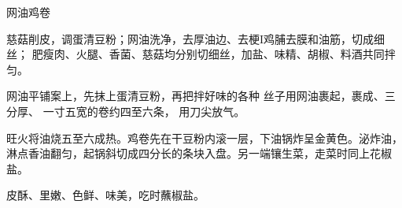 \begin{recipe}{网油鸡卷}

\ingredients



\cooking

\step 慈菇削皮，调蛋清豆粉；网油洗净，去厚油边、去梗I鸡脯去膜和油筋，切成细丝；
肥瘦肉、火腿、香菌、慈菇均分别切细丝，加盐、味精、胡椒、料酒共同拌匀。

网油平铺案上，先抹上蛋清豆粉，再把拌好味的各种 丝子用网油裹起，裹成、三分厚、
一寸五宽的卷约四至六条， 用刀尖放气。

\step 旺火将油烧五至六成热。鸡卷先在干豆粉内滚一层，下油锅炸呈金黄色。泌炸油，
淋点香油翻匀，起锅斜切成四分长的条块入盘。另一端镶生菜，走菜时同上花椒盐。

\features

皮酥、里嫩、色鲜、味美，吃时蘸椒盐。

\end{recipe}

